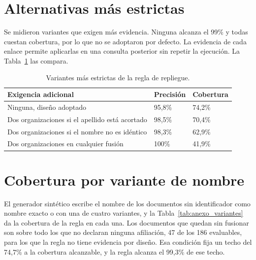 \section{Alternativas más estrictas}
\label{sec:anexo_resolucion_alternativas}

Se midieron variantes que exigen más evidencia. Ninguna alcanza el 99\% y
todas cuestan cobertura, por lo que no se adoptaron por defecto. La
evidencia de cada enlace permite aplicarlas en una consulta posterior sin
repetir la ejecución. La Tabla~\ref{tab:anexo_estrictas} las compara.

\begin{table}[H]
  \centering
  \small
  \renewcommand{\arraystretch}{1.15}
  \begin{tabular}{
    >{\raggedright\arraybackslash}p{}
    p{} p{}}
    \hline
    \textbf{Exigencia adicional} & \textbf{Precisión} & \textbf{Cobertura} \\
    \hline
    Ninguna, diseño adoptado & 95,8\% & 74,2\% \\
    Dos organizaciones si el apellido está acortado & 98,5\% & 70,4\% \\
    Dos organizaciones si el nombre no es idéntico & 98,3\% & 62,9\% \\
    Dos organizaciones en cualquier fusión & 100\% & 41,9\% \\
    \hline
  \end{tabular}
  \caption{Variantes más estrictas de la regla de repliegue.}
  \label{tab:anexo_estrictas}
\end{table}

\section{Cobertura por variante de nombre}
\label{sec:anexo_resolucion_variantes}

El generador sintético escribe el nombre de los documentos sin identificador
como nombre exacto o con una de cuatro variantes, y la Tabla~\ref{tab:anexo_variantes} da la cobertura de la
regla en cada una. Los documentos que quedan sin fusionar son sobre todo los
que no declaran ninguna afiliación, 47 de los 186 evaluables, para los que la
regla no tiene evidencia por diseño. Esa condición fija un techo del 74,7\%
a la cobertura alcanzable, y la regla alcanza el 99,3\% de ese techo.

